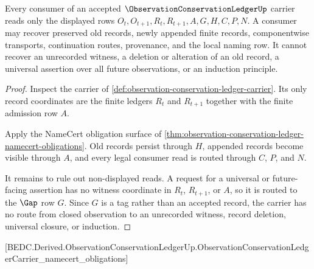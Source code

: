 \begin{theorem}
\label{thm:observation-conservation-ledger-nonescape}
Every consumer of an accepted $\ObservationConservationLedgerUp$ carrier reads only the displayed rows $O_t,O_{t+1},R_t,R_{t+1},A,G,H,C,P,N$. A consumer may recover preserved old records, newly appended finite records, componentwise transports, continuation routes, provenance, and the local naming row. It cannot recover an unrecorded witness, a deletion or alteration of an old record, a universal assertion over all future observations, or an induction principle.
\end{theorem}
\begin{proof}
Inspect the carrier of \autoref{def:observation-conservation-ledger-carrier}. Its only record coordinates are the finite ledgers $R_t$ and $R_{t+1}$ together with the finite admission row $A$.

Apply the NameCert obligation surface of \autoref{thm:observation-conservation-ledger-namecert-obligations}. Old records persist through $H$, appended records become visible through $A$, and every legal consumer read is routed through $C$, $P$, and $N$.

It remains to rule out non-displayed reads. A request for a universal or future-facing assertion has no witness coordinate in $R_t$, $R_{t+1}$, or $A$, so it is routed to the $\Gap$ row $G$. Since $G$ is a tag rather than an accepted record, the carrier has no route from closed observation to an unrecorded witness, record deletion, universal closure, or induction.
\end{proof}

[BEDC.Derived.ObservationConservationLedgerUp.ObservationConservationLedgerCarrier\_namecert\_obligations]

